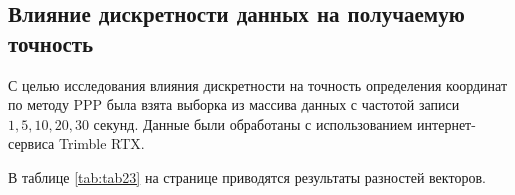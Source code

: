 \subsection{Влияние дискретности данных на получаемую точность}\label{subsec:ch2/sec3/sub4}


С целью исследования влияния дискретности на точность определения координат по методу PPP была взята выборка из массива данных с частотой записи $1, 5, 10, 20, 30$ секунд. Данные были обработаны с использованием интернет-сервиса Trimble RTX.

В таблице \cref{tab:tab23} на странице %
приводятся результаты разностей векторов.




